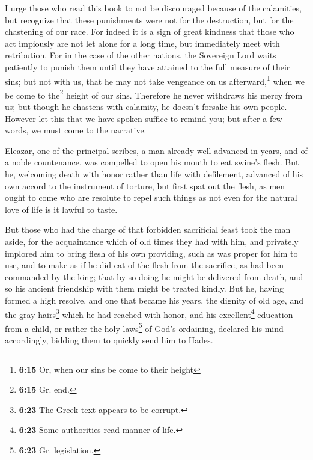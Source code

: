  I urge those who read this book to not be discouraged
because of the calamities, but recognize that these punishments were not
for the destruction, but for the chastening of our race. 
For indeed it is a sign of great kindness that those who act impiously
are not let alone for a long time, but immediately meet with
retribution.  For in the case of the other nations, the
Sovereign Lord waits patiently to punish them until they have attained
to the full measure of their sins; but not with us,  that
he may not take vengeance on us afterward,\footnote{\textbf{6:15} Or,
  when our sins be come to their height} when we be come to
the\footnote{\textbf{6:15} Gr. end.} height of our sins. 
Therefore he never withdraws his mercy from us; but though he chastens
with calamity, he doesn't forsake his own people. 
However let this that we have spoken suffice to remind you; but after a
few words, we must come to the narrative.

 Eleazar, one of the principal scribes, a man already
well advanced in years, and of a noble countenance, was compelled to
open his mouth to eat swine's flesh.  But he, welcoming
death with honor rather than life with defilement, advanced of his own
accord to the instrument of torture, but first spat out the flesh,
 as men ought to come who are resolute to repel such
things as not even for the natural love of life is it lawful to taste.

 But those who had the charge of that forbidden
sacrificial feast took the man aside, for the acquaintance which of old
times they had with him, and privately implored him to bring flesh of
his own providing, such as was proper for him to use, and to make as if
he did eat of the flesh from the sacrifice, as had been commanded by the
king;  that by so doing he might be delivered from death,
and so his ancient friendship with them might be treated kindly.
 But he, having formed a high resolve, and one that
became his years, the dignity of old age, and the gray hairs\footnote{\textbf{6:23}
  The Greek text appears to be corrupt.} which he had reached with
honor, and his excellent\footnote{\textbf{6:23} Some authorities read
  manner of life.} education from a child, or rather the holy
laws\footnote{\textbf{6:23} Gr. legislation.} of God's ordaining,
declared his mind accordingly, bidding them to quickly send him to
Hades.

